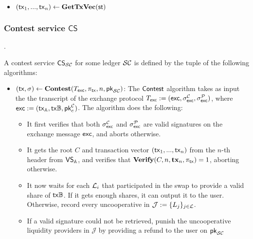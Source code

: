 \begin{itemize}
    \item $(\tx_1, ..., \tx_n) \gets \textbf{GetTxVec}(\st)$
\end{itemize}

\subsubsection{Contest service $\mathsf{CS}$}.

\begin{definition}
A contest service $\mathsf{CS}_{\mathcal{SC}}$ for some ledger $\mathcal{SC}$ is defined by the tuple of the following algorithms:
\begin{itemize}[topsep=0pt, itemsep=0pt, leftmargin=2em]
    \item $(\mathsf{tx}, \sigma) \gets \mathbf{Contest}(T_{\mathsf{exc}}, \pi_{\mathsf{tx}}, n, \mathsf{pk}_{\mathcal{SC}})$: The $\mathsf{Contest}$ algorithm takes as input the the transcript of the exchange protocol $T_{\mathsf{exc}} := (\mathsf{exc}, \sigma^{\mathcal{C}}_{\mathsf{exc}}, \sigma^{\mathcal{P}}_{\mathsf{exc}})$, where $\mathsf{exc} := (\mathsf{tx}_{\mathbb{A}}, \mathsf{tx}{\mathbb{B}}, \mathsf{pk}_c^{\mathcal{C}})$. The algorithm does the following:
    \begin{itemize}
    \item It first verifies that both $\sigma^{\mathcal{C}}_{\mathsf{exc}}$ and $\sigma^{\mathcal{P}}_{\mathsf{exc}}$ are valid signatures on the exchange message $\mathsf{exc}$, and aborts otherwise.
    \item It gets the root $C$ and transaction vector $(\mathsf{tx}_1, ..., \mathsf{tx}_n)$ from the $n$-th header from $\mathsf{VS}_{\mathbb{A}}$, and verifies that $\textbf{Verify}(C, n, \mathbf{tx}_n, \pi_{\mathsf{tx}}) = 1$, aborting otherwise.
    \item It now waits for each $\mathcal{L}_i$ that participated in the swap to provide a valid share of $\mathsf{tx}{\mathbb{B}}$. If it gets enough shares, it can output it to the user. Otherwise, record every uncooperative in $\mathcal{J} := \{ L_j \}_{j \in \mathcal{L}}$.
    \item If a valid signature could not be retrieved, punish the uncooperative liquidity providers in $\mathcal{J}$ by providing a refund to the user on $\mathsf{pk}_{\mathcal{SC}}$
    \end{itemize}
\end{itemize}
\end{definition}

